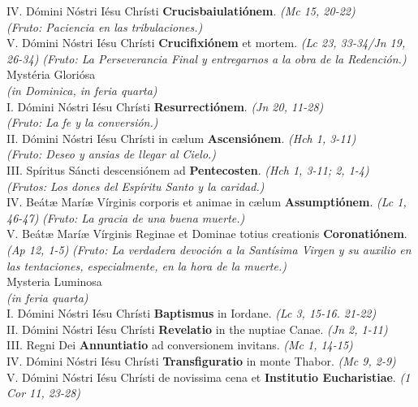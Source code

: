 \documentclass[letterpaper, landscape, 10pt, twocolumn]{article}
\begin{document}
  \thispagestyle{empty}
  \noindent
  {\color{red} IV.} Dómini Nóstri Iésu Chrísti \textbf{Crucisbaiulatiónem}. {\color{red} \textit{(Mc 15, 20-22)\\
  (Fruto: Paciencia en las tribulaciones.)}}\\
  {\color{red} V.} Dómini Nóstri Iésu Chrísti \textbf{Crucifixiónem} et mortem. {\color{red} \textit{(Lc 23, 33-34/Jn 19, 26-34) (Fruto: La Perseverancia Final y entregarnos a la obra de la Redención.)}}\\

  \Large {\color{red} Mystéria Gloriósa}\\
  \normalsize {\color{red} \textit{(in Dominica, in feria quarta)}}\\
  {\color{red} I.} Dómini Nóstri Iésu Chrísti \textbf{Resurrectiónem}. {\color{red} \textit{(Jn 20, 11-28)}}\\
  {\color{red} \textit{(Fruto: La fe y la conversión.)}}\\
  {\color{red} II.} Dómini Nóstri Iésu Chrísti in cælum \textbf{Ascensiónem}. {\color{red} \textit{(Hch 1, 3-11)}}\\
  {\color{red} \textit{(Fruto: Deseo y ansias de llegar al Cielo.)}}\\
  {\color{red} III.} Spíritus Sáncti descensiónem ad \textbf{Pentecosten}. {\color{red} \textit{(Hch 1, 3-11; 2, 1-4)}}\\
  {\color{red} \textit{(Frutos: Los dones del Espíritu Santo y la caridad.)}}\\
  {\color{red} IV.} Beátæ Maríæ Vírginis corporis et animae in cælum \textbf{Assumptiónem}. {\color{red} \textit{(Lc 1, 46-47)}} {\color{red} \textit{(Fruto: La gracia de una buena muerte.)}}\\
  {\color{red} V.} Beátæ Maríæ Vírginis Reginae et Dominae totius creationis
  \textbf{Coronatiónem}. {\color{red} \textit{(Ap 12, 1-5)}} {\color{red} \textit{(Fruto: La verdadera devoción a la Santísima Virgen y su auxilio en las tentaciones, especialmente, en la hora de la muerte.)}}\\

  \Large {\color{red} Mysteria Luminosa}\\
  \normalsize {\color{red} \textit{(in feria quarta)}}\\
  {\color{red} I.} Dómini Nóstri Iésu Chrísti \textbf{Baptismus} in Iordane. {\color{red} \textit{(Lc 3, 15-16. 21-22)}}\\
  {\color{red} II.} Dómini Nóstri Iésu Chrísti \textbf{Revelatio} in the nuptiae Canae. {\color{red} \textit{(Jn 2, 1-11)}}\\
  {\color{red} III.} Regni Dei \textbf{Annuntiatio} ad conversionem invitans. {\color{red} \textit{(Mc 1, 14-15)}}\\
  {\color{red} IV.} Dómini Nóstri Iésu Chrísti \textbf{Transfiguratio} in monte Thabor.
  {\color{red} \textit{(Mc 9, 2-9)}}\\
  {\color{red} V.} Dómini Nóstri Iésu Chrísti de novissima cena et \textbf{Institutio Eucharistiae}. {\color{red} \textit{(1 Cor 11, 23-28)}}\\
\end{document}
